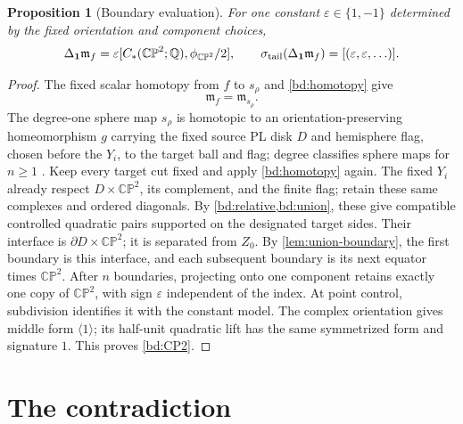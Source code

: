 \documentclass[11pt]{amsart}
\numberwithin{equation}{section}
\newtheorem{proposition}[proposition]{Proposition}
\theoremstyle{definition}
\theoremstyle{remark}
\newcommand{\Q}{\mathbb Q}
\newcommand{\CP}{\mathbb {CP}}
\begin{document}
\begin{proposition}[Boundary evaluation]\label{bd:pinch-value}
For one constant $\varepsilon\in\{1,-1\}$ determined by the fixed
orientation and component choices,
\begin{equation}\label{bd:CP2}
 \Delta_{\mathbf1}\mathfrak m_f
   =\varepsilon[C_*(\CP^2;\Q),\phi_{\CP^2}/2],\qquad
 \sigma_{\rm tail}(\Delta_{\mathbf1}\mathfrak m_f)
   =[(\varepsilon,\varepsilon,\ldots)].
\end{equation}
\end{proposition}
\begin{proof}
The fixed scalar homotopy from $f$ to $s_\rho$ and
\cref{bd:homotopy} give
\begin{equation}\label{bd:pinch-homotopy}
 \mathfrak m_f=\mathfrak m_{s_\rho}.
\end{equation}
The degree-one sphere map $s_\rho$ is homotopic to an
orientation-preserving homeomorphism $g$ carrying the fixed source PL
disk $D$ and hemisphere flag, chosen before the $Y_i$, to the target ball
and flag; degree
classifies sphere maps for $n\ge1$ \cite[Corollary 4.25]{Hat02}.
Keep every target cut fixed and apply \cref{bd:homotopy} again.
The fixed $Y_i$ already respect $D\times\CP^2$, its complement,
and the finite flag; retain these same complexes and ordered diagonals.
By \cref{bd:relative,bd:union}, these give compatible controlled
quadratic pairs supported on the designated target sides. Their
interface is $\partial D\times\CP^2$; it is separated from $Z_0$.
By \cref{lem:union-boundary}, the first boundary is this interface,
and each subsequent boundary is its next equator times $\CP^2$.
After $n$ boundaries, projecting onto one component retains exactly
one copy of $\CP^2$, with sign $\varepsilon$ independent of the index.
At point control, subdivision identifies it with the constant model.
The complex orientation gives middle form $\langle1\rangle$;
its half-unit quadratic lift has the same symmetrized form and
signature $1$. This proves \eqref{bd:CP2}.
\end{proof}

\section{The contradiction}\label{sec:contradiction}
\end{document}
